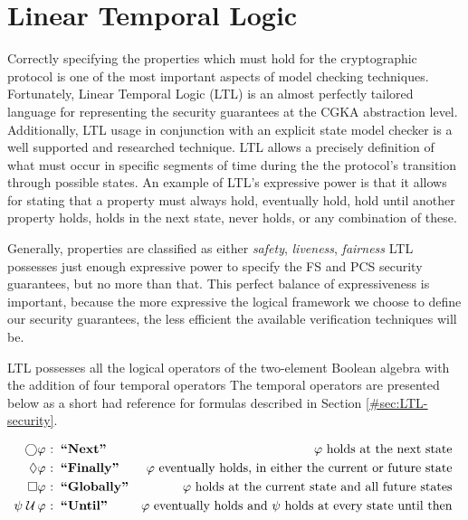 \hypertarget{linear-temporal-logic}{%
\section{Linear Temporal Logic}\label{linear-temporal-logic}}

Correctly specifying the properties which must hold for the cryptographic protocol is one of the most important aspects of model checking techniques.
Fortunately, Linear Temporal Logic (LTL) \autocite{4567924} is an almost perfectly tailored language for representing the security guarantees at the CGKA abstraction level.
Additionally, LTL usage in conjunction with an explicit state model checker is a well supported and researched technique.
LTL allows a precisely definition of what must occur in specific segments of time during the the protocol's transition through possible states.
An example of LTL's expressive power is that it allows for stating that a property must always hold, eventually hold, hold until another property holds, holds in the next state, never holds, or any combination of these.

Generally, properties are classified as either \emph{safety}, \emph{liveness}, \emph{fairness}
LTL possesses just enough expressive power to specify the FS and PCS security guarantees, but no more than that.
This perfect balance of expressiveness is important, because the more expressive the logical framework we choose to define our security guarantees, the less efficient the available verification techniques will be.

LTL possesses all the logical operators of the two-element Boolean algebra with the addition of four temporal operators
The temporal operators are presented below as a short had reference for formulas described in Section \ref{#sec:LTL-security}.

\[
\begin{aligned}[t]
                 \bigcirc & \varphi & \!\!\!\!\textrm{:} & \;\;\textbf{``Next''}     & \varphi\textrm{ holds at the next state} \hfill~ &\\
                 \Diamond & \varphi & \!\!\!\!\textrm{:} & \;\;\textbf{``Finally''}  & \varphi\textrm{ eventually holds, in either the current or future state} \hfill~ &\\
                 \Box     & \varphi & \!\!\!\!\textrm{:} & \;\;\textbf{``Globally''} & \varphi\textrm{ holds at the current state and all future states} \hfill~ &\\
  \psi \;{\mathcal {U}}\, & \varphi & \!\!\!\!\textrm{:} & \;\;\textbf{``Until''}    & \varphi\textrm{ eventually holds and $\psi$ holds at every state until then} \hfill~ &\\
\end{aligned}
\]


